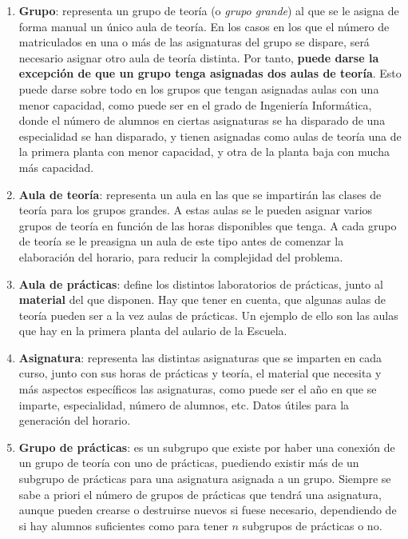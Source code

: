 \begin{enumerate}[---]
    
    \item \textbf{Grupo}: representa un grupo de teoría (o \textit{grupo grande}) al que se le asigna de forma manual un único aula de teoría. En los casos en los que el número de matriculados en una o más de las asignaturas del grupo se dispare, será necesario asignar otro aula de teoría distinta. Por tanto, \textbf{puede darse la excepción de que un grupo tenga asignadas dos aulas de teoría}. Esto puede darse sobre todo en los grupos que tengan asignadas aulas con una menor capacidad, como puede ser en el grado de Ingeniería Informática, donde el número de alumnos en ciertas asignaturas se ha disparado de una especialidad se han disparado, y tienen asignadas como aulas de teoría una de la primera planta con menor capacidad, y otra de la planta baja con mucha más capacidad.
    
    \item \textbf{Aula de teoría}: representa un aula en las que se impartirán las clases de teoría para los grupos grandes. A estas aulas se le pueden asignar varios grupos de teoría en función de las horas disponibles que tenga. A cada grupo de teoría se le preasigna un aula de este tipo antes de comenzar la elaboración del horario, para reducir la complejidad del problema.

    \item \textbf{Aula de prácticas}: define los distintos laboratorios de prácticas, junto al \textbf{material} del que disponen. Hay que tener en cuenta, que algunas aulas de teoría pueden ser a la vez aulas de prácticas. Un ejemplo de ello son las aulas que hay en la primera planta del aulario de la Escuela.

    \item \textbf{Asignatura}: representa las distintas asignaturas que se imparten en cada curso, junto con sus horas de prácticas y teoría, el material que necesita y más aspectos específicos las asignaturas, como puede ser el año en que se imparte, especialidad, número de alumnos, etc. Datos útiles para la generación del horario.

    \item \textbf{Grupo de prácticas}: es un subgrupo que existe por haber una conexión de un grupo de teoría con uno de prácticas, puediendo existir más de un subgrupo de prácticas para una asignatura asignada a un grupo. Siempre se sabe a priori el número de grupos de prácticas que tendrá una asignatura, aunque pueden crearse o destruirse nuevos si fuese necesario, dependiendo de si hay alumnos suficientes como para tener $n$ subgrupos de prácticas o no.
\end{enumerate}


